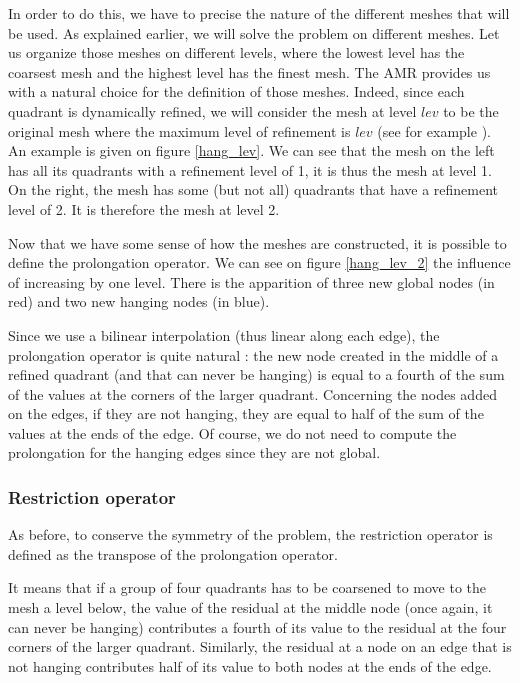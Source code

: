 In order to do this, we have to precise the nature of the different meshes that will be used. As explained earlier, we will solve the problem on different meshes. Let us organize those meshes on different levels, where the lowest level has the coarsest mesh and the highest level has the finest mesh.  The AMR provides us with a natural choice for the definition of those meshes. Indeed, since each quadrant is dynamically refined, we will consider the mesh at level $lev$ to be the original mesh where the maximum level of refinement is $lev$ (see for example \cite{levelMulti}). An example is given on figure \ref{hang_lev}. We can see that the mesh on the left has all its quadrants with a refinement level of 1, it is thus the mesh at level 1. On the right, the mesh has some (but not all) quadrants that have a refinement level of 2. It is therefore the mesh at level 2. 

Now that we have some sense of how the meshes are constructed, it is possible to define the prolongation operator. We can see on figure \ref{hang_lev_2} the influence of increasing by one level. There is the apparition of three new global nodes (in red) and two new hanging nodes (in blue).

Since we use a bilinear interpolation (thus linear along each edge), the prolongation operator is quite natural : the new node created in the middle of a refined quadrant (and that can never be hanging) is equal to a fourth of the sum of the values at the corners of the larger quadrant. Concerning the nodes added on the edges, if they are not hanging, they are equal to half of the sum of the values at the ends of the edge. Of course, we do not need to compute the prolongation for the hanging edges since they are not global. 

\subsubsection{Restriction operator}

As before, to conserve the symmetry of the problem, the restriction operator is defined as the transpose of the prolongation operator. 

It means that if a group of four quadrants has to be coarsened to move to the mesh a level below, the value of the residual at the middle node (once again, it can never be hanging) contributes a fourth of its value to the residual at the four corners of the larger quadrant. Similarly, the residual at a node on an edge that is not hanging contributes half of its value to both nodes at the ends of the edge. 

